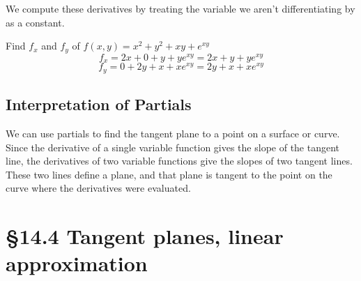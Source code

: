 \documentclass[12 pt]{article}
\begin{document}
        We compute these derivatives by treating the variable we aren't differentiating by as a constant.
        \begin{exmp*}
            Find $f_x$ and $f_y$ of $f(x,y)=x^2+y^2+xy+e^{xy}$
            $$f_x=2x+0+y+ye^{xy}=2x+y+ye^{xy}$$
            $$f_y=0+2y+x+xe^{xy}=2y+x+xe^{xy}$$
        \end{exmp*}

        \subsection{Interpretation of Partials}

        We can use partials to find the tangent plane to a point on a surface or curve. Since the derivative of a single variable function gives the slope of the tangent line, the derivatives of two variable functions give the slopes of two tangent lines. These two lines define a plane, and that plane is tangent to the point on the curve where the derivatives were evaluated.
    \section{\S 14.4 Tangent planes, linear approximation}
\end{document}
